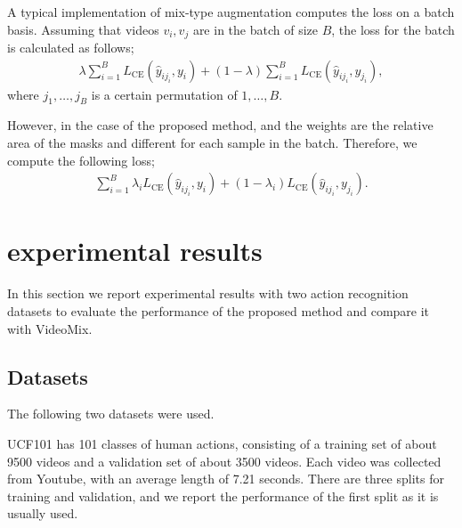 A typical implementation of mix-type augmentation
computes the loss on a batch basis.
Assuming that videos $v_i, v_j$ are in the batch of size $B$,
the loss for the batch is calculated as follows;
\begin{align}
    \lambda \sum_{i=1}^B L_\mathrm{CE} (\hat{y}_{ij_i}, y_{i}) +
    (1 - \lambda) \sum_{i=1}^B L_\mathrm{CE} (\hat{y}_{ij_i}, y_{j_i}),
\end{align}
where $j_1,\ldots,j_B$ is a certain permutation of $1,\ldots,B$.


However, in the case of the proposed method,
and the weights are the relative area of the masks and
different for each sample in the batch.
Therefore, we compute the following loss;
\begin{align}
    \sum_{i=1}^B
    \lambda_{i} L_\mathrm{CE} (\hat{y}_{ij_i}, y_{i}) +
    (1 - \lambda_{i}) L_\mathrm{CE} (\hat{y}_{ij_i}, y_{j_i}).
\end{align}




\section{experimental results}

In this section
we report experimental results with two action recognition datasets
to evaluate the performance of the proposed method and compare it with VideoMix.


\subsection{Datasets}

The following two datasets were used.

UCF101 \cite{DBLP:ucf101}
has 101 classes of human actions, consisting of a training set of about 9500 videos and a validation set of about 3500 videos.
Each video was collected from Youtube, 
with an average length of 7.21 seconds.
There are three splits for training and validation, 
and we report the performance of the first split as it is usually used.



